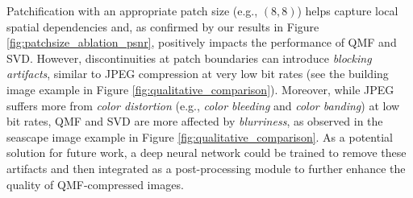 Patchification with an appropriate patch size (e.g., $(8, 8)$) helps capture local spatial dependencies and, as confirmed by our results in Figure \ref{fig:patchsize_ablation_psnr}, positively impacts the performance of QMF and SVD. However, discontinuities at patch boundaries can introduce \emph{blocking artifacts}, similar to JPEG compression at very low bit rates (see the building image example in Figure \ref{fig:qualitative_comparison}). Moreover, while JPEG suffers more from \emph{color distortion} (e.g., \emph{color bleeding} and \emph{color banding}) at low bit rates, QMF and SVD are more affected by \emph{blurriness}, as observed in the seascape image example in Figure \ref{fig:qualitative_comparison}. As a potential solution for future work, a deep neural network could be trained to remove these artifacts and then integrated as a post-processing module to further enhance the quality of QMF-compressed images.

